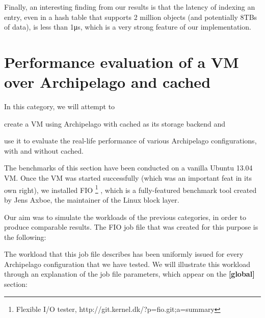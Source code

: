 Finally, an interesting finding from our results is that the latency of 
indexing an entry, even in a hash table that supports 2 million objects (and 
potentially 8TBs of data), is less than 1μs, which is a very strong feature of 
our implementation.

\begin{comment}
As a side note, we observe a constant decrease in writelatency as the number of 
objects increase this is not something that should be attributed to our 
implementation. (explain that we have used a hash table that holds 2million 
objects, so it is not mapped to our process's address space. When more objects 
are indexed, the hash table becomes fuller and the latency of mmap()s is 
equally distributed to the objects. Else, the hash table is more scarce but the 
same blocks are hit, albeit not fully written, and thus the mmap latency is the 
same but distributed to less objects.)
\end{comment}

\section{Performance evaluation of a VM over Archipelago and cached}
\label{sec:vm-plot}

In this category, we will attempt to
\begin{inparaenum}[i)]
	\item create a VM using Archipelago with cached as its storage backend 
		and
	\item use it to evaluate the real-life performance of various Archipelago 
		configurations, with and without cached.
\end{inparaenum}

The benchmarks of this section have been conducted on a vanilla Ubuntu 13.04 
VM. Once the VM was started successfully (which was an important feat in its 
own right), we installed FIO
\footnote{Flexible I/O tester, http://git.kernel.dk/?p=fio.git;a=summary}
, which is a fully-featured benchmark tool created by Jens Axboe, the 
maintainer of the Linux block layer.

Our aim was to simulate the workloads of the previous categories, in order to 
produce comparable results. The FIO job file that was created for this purpose 
is the following:


The workload that this job file describes has been uniformly issued for every
Archipelago configuration that we have tested. We will illustrate this workload 
through an explanation of the job file parameters, which appear on the 
\textbf{[global]} section:

